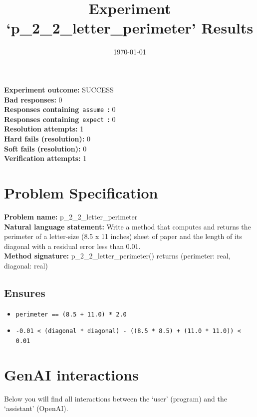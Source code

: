 \documentclass{article}
\begin{document}
\title{Experiment `p\_2\_2\_letter\_perimeter' Results}
\author{\today}
\date{}
\maketitle
\textbf{Experiment outcome: }SUCCESS
\\\textbf{Bad responses: }0
\\\textbf{Responses containing}~\texttt{assume}~\textbf{: }0
\\\textbf{Responses containing}~\texttt{expect}~\textbf{: }0
\\\textbf{Resolution attempts: }1
\\\textbf{Hard fails (resolution): }0
\\\textbf{Soft fails (resolution): }0
\\\textbf{Verification attempts: }1
\section*{Problem Specification}
\textbf{Problem name: }p\_2\_2\_letter\_perimeter
\\\textbf{Natural language statement: }Write a method that computes and returns the perimeter of a letter-size (8.5 x 11 inches) sheet of paper and the length of its diagonal with a residual error less than 0.01.
\\\textbf{Method signature: }p\_2\_2\_letter\_perimeter() returns (perimeter: real, diagonal: real)
\subsection*{Ensures}
\begin{itemize}
\item \texttt{perimeter == (8.5 + 11.0) * 2.0}
\item \texttt{-0.01 < (diagonal * diagonal) - ((8.5 * 8.5) + (11.0 * 11.0)) < 0.01}
\end{itemize}
\clearpage
\section*{GenAI interactions}
Below you will find all interactions between the `user' (program) and the `assistant' (OpenAI).
\end{document}

